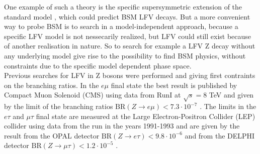 One example of such a theory is the specific supersymmetric extension of the standard model \cite{SUSYLFV}, which could predict \gls{BSM} \gls{LFV} decays. But a more convenient way to probe \gls{BSM} is to search in a model-independent approach, because a specific \gls{LFV} model is not nessecarily realized, but \gls{LFV} could still exist because of another realisation in nature. So to search for example a \gls{LFV} Z decay without any underlying model give rise to the possibility to find \gls{BSM} physics, without constraints due to the specific model dependent phase space. \\

Previous searches for \gls{LFV} in Z bosons were performed and giving first contraints on the branching ratios. In the $e\mu$ final state the best result is published by Compact Muon Solenoid (\gls{CMS}) using data from RunI at $\sqrt{s} = 8$ TeV and given by the limit of the branching ratios $\text{BR}(Z\to e\mu) < 7.3\cdot 10^{-7}$ \cite{LFVEMU}. The limits in the $e\tau$ and $\mu\tau$ final state are measured at the Large Electron-Positron Collider (\gls{LEP}) \cite{LEP} collider using data from the run in the years 1991-1993 and are given by the result from the OPAL detector $\text{BR}(Z\to e\tau) < 9.8\cdot 10^{-6}$ \cite{LFVETAU} and from the DELPHI detector $\text{BR}(Z\to \mu\tau) < 1.2\cdot 10^{-5}$ \cite{LFVMUTAU}.
